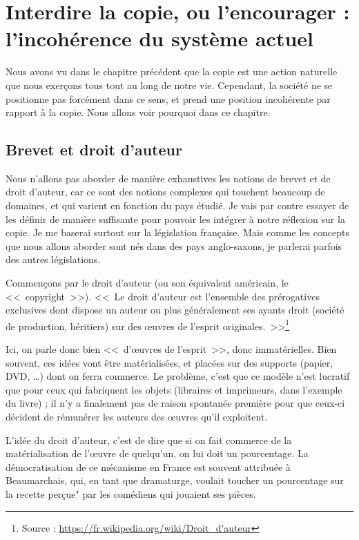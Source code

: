 \chapter{Interdire la copie, ou l'encourager : l'incohérence du système actuel}

Nous avons vu dans le chapitre précédent que la copie est une action naturelle que nous exerçons tous tout au long de notre vie.
Cependant, la société ne se positionne pas forcément dans ce sens, et prend une position incohérente par rapport à la copie.
Nous allons voir pourquoi dans ce chapitre.

\section{Brevet et droit d'auteur}

Nous n'allons pas aborder de manière exhaustives les notions de brevet et de droit d'auteur, car ce sont des notions complexes qui touchent beaucoup de domaines, et qui varient en fonction du pays étudié.
Je vais par contre essayer de les définir de manière suffisante pour pouvoir les intégrer à notre réflexion sur la copie.
Je me baserai surtout sur la législation française.
Mais comme les concepts que nous allons aborder sont nés dans des pays anglo-saxons, je parlerai parfois des autres législations.

Commençons par le droit d'auteur (ou son équivalent américain, le <<~copyright~>>).
<<~Le droit d'auteur est l'ensemble des prérogatives exclusives dont dispose un auteur ou plus généralement ses ayants droit (société de production, héritiers) sur des œuvres de l'esprit originales.~>>\footnote{Source : \url{https://fr.wikipedia.org/wiki/Droit_d'auteur}}

Ici, on parle donc bien <<~d'œuvres de l'esprit~>>, donc immatérielles.
Bien souvent, ces idées vont être matérialisées, et placées sur des supports (papier, DVD, \dots{}) dont on ferra commerce.
Le problème, c'est que ce modèle n'est lucratif que pour ceux qui fabriquent les objets (libraires et imprimeurs, dans l'exemple du livre) ; il n'y a finalement pas de raison spontanée première pour que ceux-ci décident de rémunérer les auteurs des œuvres qu'il exploitent.

\label{droit-auteur}
L'idée du droit d'auteur, c'est de dire que si on fait commerce de la matérialisation de l'œuvre de quelqu'un, on lui doit un pourcentage.
La démocratisation de ce mécanisme en France est souvent attribuée à Beaumarchais, qui, en tant que dramaturge, voulait toucher un pourcentage sur la recette perçue" par les comédiens qui jouaient ses pièces.

